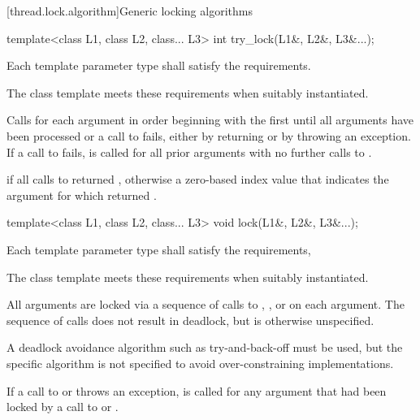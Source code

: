 [thread.lock.algorithm]{Generic locking algorithms}

%
\begin{itemdecl}
template<class L1, class L2, class... L3> int try_lock(L1&, L2&, L3&...);
\end{itemdecl}

\begin{itemdescr}
\pnum
\requires Each template parameter type shall satisfy the  requirements. \begin{note} The
 class template meets these requirements when suitably instantiated.
\end{note}

\pnum
\effects Calls  for each argument in order beginning with the
first until all arguments have been processed or a call to  fails,
either by returning  or by throwing an exception. If a call to
 fails,  is called for all prior arguments
with no further calls to .

\pnum
\returns {} if all calls to  returned ,
otherwise a zero-based index value that indicates the argument for which 
returned .
\end{itemdescr}

%
\begin{itemdecl}
template<class L1, class L2, class... L3> void lock(L1&, L2&, L3&...);
\end{itemdecl}

\begin{itemdescr}
\pnum
\requires Each template parameter type shall satisfy the  requirements,
\begin{note} The
 class template meets these requirements when suitably instantiated.
\end{note}

\pnum
\effects All arguments are locked via a sequence of calls to ,
, or  on each argument. The sequence of calls does
not result in deadlock, but is otherwise unspecified. \begin{note} A deadlock avoidance
algorithm such as try-and-back-off must be used, but the specific algorithm is not
specified to avoid over-constraining implementations. \end{note} If a call to
 or  throws an exception,  is
called for any argument that had been locked by a call to  or
.
\end{itemdescr}

